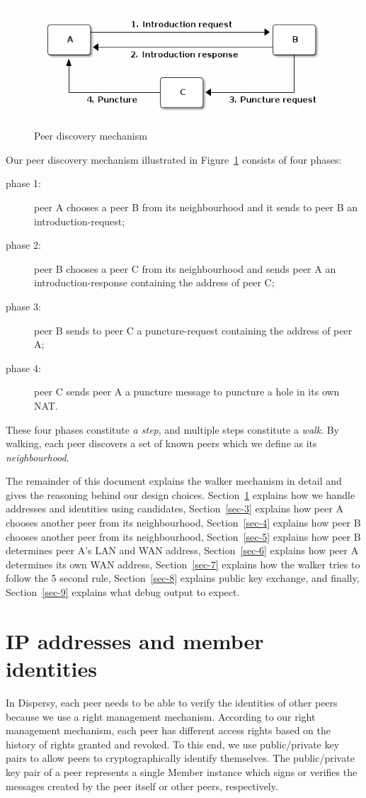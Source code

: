 \begin{figure}{}
\centering
\includegraphics[width=.9\linewidth]{walk.png}
\caption{\label{fig:walk}Peer discovery mechanism}
\end{figure}

Our peer discovery mechanism illustrated in Figure~\ref{fig:walk}
consists of four phases:
\begin{description}
\item[{phase 1:}] peer A chooses a peer B from its neighbourhood and it
sends to peer B an introduction-request;
\item[{phase 2:}] peer B chooses a peer C from its neighbourhood and sends
peer A an introduction-response containing the address
of peer C;
\item[{phase 3:}] peer B sends to peer C a puncture-request containing the
address of peer A;
\item[{phase 4:}] peer C sends peer A a puncture message to puncture a
hole in its own NAT.
\end{description}

These four phases constitute \emph{a step}, and multiple steps constitute a
\emph{walk}.  By walking, each peer discovers a set of known peers which we
define as its \emph{neighbourhood}.

The remainder of this document explains the walker mechanism in detail
and gives the reasoning behind our design choices.  Section~\ref{sec-2} explains how we handle addresses and
identities using candidates, Section~\ref{sec-3} explains how peer
A chooses another peer from its neighbourhood, Section~\ref{sec-4} explains how peer B chooses another peer from its
neighbourhood, Section~\ref{sec-5} explains how peer B
determines peer A's LAN and WAN address, Section~\ref{sec-6}
explains how peer A determines its own WAN address, Section~\ref{sec-7} explains how the walker tries to follow the 5 second rule,
Section~\ref{sec-8} explains public key exchange, and
finally, Section~\ref{sec-9} explains what debug output to expect.
\section{IP addresses and member identities}
\label{sec-2}
In Dispersy, each peer needs to be able to verify the identities of
other peers because we use a right management mechanism.  According to
our right management mechanism, each peer has different access rights
based on the history of rights granted and revoked.  To this end, we
use public/private key pairs to allow peers to cryptographically
identify themselves.  The public/private key pair of a peer represents
a single Member instance which signs or verifies the messages created
by the peer itself or other peers, respectively.

